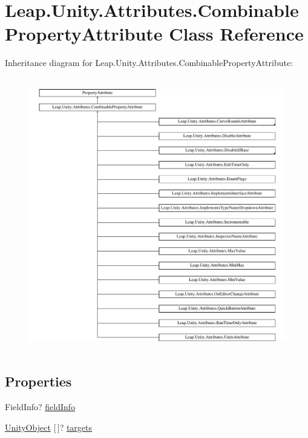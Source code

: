 \hypertarget{class_leap_1_1_unity_1_1_attributes_1_1_combinable_property_attribute}{}\section{Leap.\+Unity.\+Attributes.\+Combinable\+Property\+Attribute Class Reference}
\label{class_leap_1_1_unity_1_1_attributes_1_1_combinable_property_attribute}
Inheritance diagram for Leap.\+Unity.\+Attributes.\+Combinable\+Property\+Attribute\+:\begin{figure}[H]
\begin{center}
\leavevmode
\includegraphics[height=12.000000cm]{class_leap_1_1_unity_1_1_attributes_1_1_combinable_property_attribute}
\end{center}
\end{figure}
\subsection*{Properties}
\begin{DoxyCompactItemize}
\item 
Field\+Info? \mbox{\hyperlink{class_leap_1_1_unity_1_1_attributes_1_1_combinable_property_attribute_ae004e1a43bf7445dd61fe2f519a6f937}{field\+Info}}
\item 
\mbox{\hyperlink{namespace_leap_1_1_unity_1_1_attributes_a71d15e38cb19d7d2ffb1aa310ce8f0f9}{Unity\+Object}} \mbox{[}$\,$\mbox{]}? \mbox{\hyperlink{class_leap_1_1_unity_1_1_attributes_1_1_combinable_property_attribute_ab36ce9f80c6312749c238f4058d632cd}{targets}}
\end{DoxyCompactItemize}


